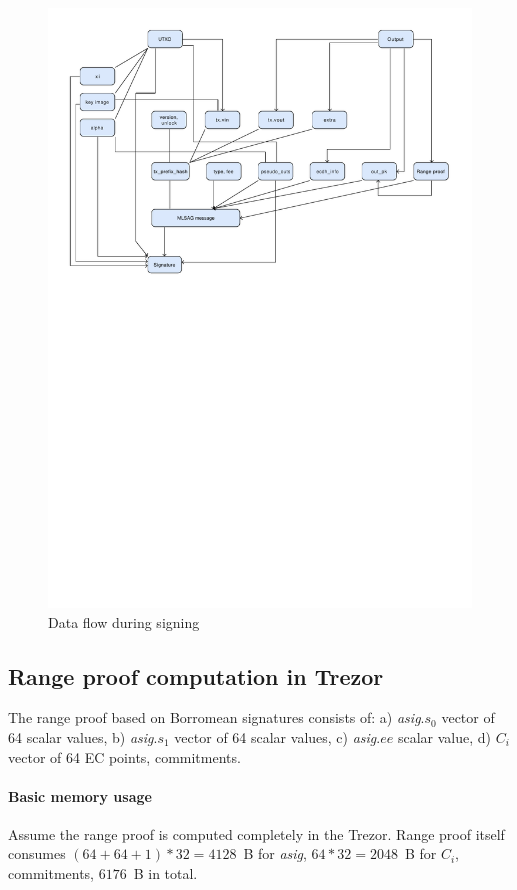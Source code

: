 \documentclass[]{article}
\begin{document}
\begin{figure}[H]
	\centering
	\includegraphics[width=1.\textwidth,trim={0 16cm 0 1cm},clip, angle=0]{img/data_flow.pdf}
	\caption{Data flow during signing} \label{fig:data_flow}
\end{figure}


\subsection{Range proof computation in Trezor}
The range proof based on Borromean signatures consists of:
a) \emph{asig}.$s_0$ vector of 64 scalar values, 
b) \emph{asig}.$s_1$ vector of 64 scalar values,
c) \emph{asig}.$ee$ scalar value,
d) $C_i$ vector of 64 EC points, commitments.

\paragraph{Basic memory usage}
Assume the range proof is computed completely in the Trezor. Range proof itself consumes $(64 + 64 + 1) * 32 = 4128$~B for \emph{asig}, $64*32 = 2048$~B for $C_i$, commitments, $6176$~B in total.
\end{document}
